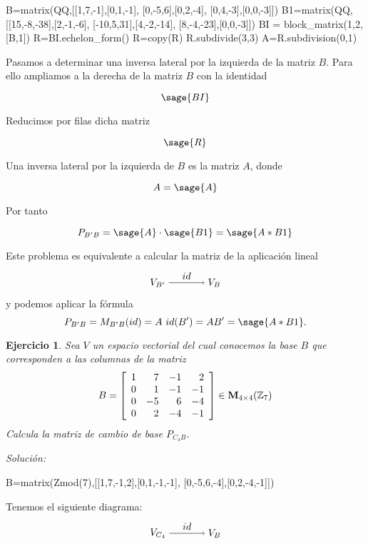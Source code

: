\documentclass{amsart}
\newtheorem{ejer}{Ejercicio}
\def\z{\mathbb{Z}}
\begin{document}
\begin{sageblock}
B=matrix(QQ,[[1,7,-1],[0,1,-1],
[0,-5,6],[0,2,-4],
[0,4,-3],[0,0,-3]])
B1=matrix(QQ,[[15,-8,-38],[2,-1,-6],
[-10,5,31],[4,-2,-14],
[8,-4,-23],[0,0,-3]])
BI = block_matrix(1,2,[B,1])
R=BI.echelon_form()
R=copy(R)
R.subdivide(3,3)
A=R.subdivision(0,1)
\end{sageblock}

Pasamos a determinar una inversa lateral por la izquierda de la matriz $B$. Para 
ello ampliamos a la derecha de la matriz $B$ con la identidad

$$ \sage{BI} $$

Reducimos por filas dicha matriz 

$$ \sage{R} $$

Una inversa lateral por la izquierda de $B$ es la matriz $A$, donde

$$ A = \sage{A} $$

Por tanto

$$ P_{B'B} = \sage{A}\cdot \sage{B1} = \sage{A*B1} $$

Este problema es equivalente a calcular la matriz de la aplicación lineal 
$$
\begin{tikzpicture}
\node (VBp) at (0,0) {$V_{B'}$};
\node (VB) at (2,0) {$V_B$};
\draw[->] (VBp) to node [above] {$id$} (VB);
\end{tikzpicture}
$$
y podemos aplicar la fórmula 
$$P_{B'B} = M_{B'B}(id) = A ~ id(B') = AB' = \sage{A*B1}.$$


\begin{ejer} Sea $V$ un espacio vectorial del cual conocemos la base $B$  
que corres\-ponden a las columnas de la matriz
\[ B = \left[\begin{array}{rrrr}
1 & 7 & -1 & 2 \\
0 & 1 & -1 & -1 \\
0 & -5 & 6 & -4 \\
0 & 2 & -4 & -1
\end{array}\right] \in {\bf  M}_{4 \times 4}({\z _7})\]
Calcula la matriz de cambio de base $P_{C_4B}$.
\end{ejer}

{\it Soluci\'on:}

\begin{sageblock}
B=matrix(Zmod(7),[[1,7,-1,2],[0,1,-1,-1],
[0,-5,6,-4],[0,2,-4,-1]])
\end{sageblock}

Tenemos el siguiente diagrama:
$$
\begin{tikzpicture}
\node (VC) at (0,0) {$V_{C_4}$};
\node (VB) at (2,0) {$V_B$};
\draw[->] (VC) to node [above] {$id$} (VB);
\end{tikzpicture}
$$
\end{document}
